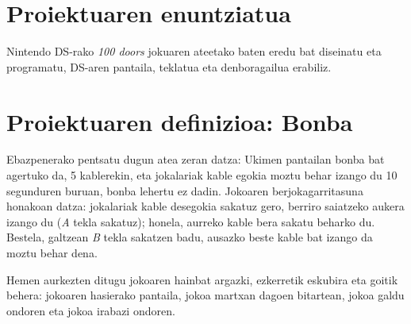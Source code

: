 \documentclass[dvipsnames]{../../../../AritzhClass}
\author{Aritz Lopez}
\begin{document}
\izenburuorrialdea

\tableofcontents

\pagebreak

\section{Proiektuaren enuntziatua}

Nintendo DS-rako \textit{100 doors} jokuaren ateetako baten eredu bat diseinatu eta programatu, DS-aren pantaila, teklatua eta denboragailua erabiliz.

\section{Proiektuaren definizioa: Bonba}

Ebazpenerako pentsatu dugun atea zeran datza: Ukimen pantailan bonba bat agertuko da, 5 kablerekin, eta jokalariak kable egokia moztu behar izango du 10 segunduren buruan, bonba lehertu ez dadin. Jokoaren berjokagarritasuna honakoan datza: jokalariak kable desegokia sakatuz gero, berriro saiatzeko aukera izango du (\textit{A} tekla sakatuz); honela, aurreko kable bera sakatu beharko du. Bestela, galtzean \textit{B} tekla sakatzen badu, ausazko beste kable bat izango da moztu behar dena.

Hemen aurkezten ditugu jokoaren hainbat argazki, ezkerretik eskubira eta goitik behera: jokoaren hasierako pantaila, jokoa martxan dagoen bitartean, jokoa galdu ondoren eta jokoa irabazi ondoren.
\end{document}
